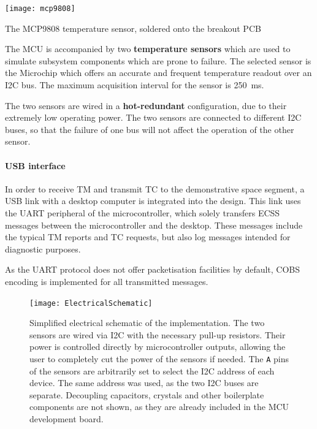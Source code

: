 \documentclass[a4paper,nobib]{tufte-book}
\begin{document}
\begin{marginfigure}
	      \texttt{[image: mcp9808]}
	      \caption{The MCP9808 temperature sensor, soldered onto the breakout \acs{PCB}}
\end{marginfigure}

The \ac{MCU} is accompanied by two \textbf{temperature sensors} which are used to simulate subsystem components which are prone to failure. The selected sensor is the Microchip  which offers an accurate and frequent temperature readout over an \ac{I2C} bus. The maximum acquisition interval for the sensor is \SI{250}{\milli\second}.


The two sensors are wired in a \textbf{hot-redundant} configuration, due to their extremely low operating power. The two sensors are connected to different \ac{I2C} buses, so that the failure of one bus will not affect the operation of the other sensor.

\paragraph{\acs{USB} interface} In order to receive \acl{TM} and transmit \acl{TC} to the demonstrative space segment, a \acs{USB} link with a desktop computer is integrated into the design. This link uses the \acs{UART} peripheral of the microcontroller, which solely transfers \acs{ECSS} messages between the microcontroller and the desktop. These messages include the typical \acs{TM} reports and \acs{TC} requests, but also log messages intended for diagnostic purposes.

As the \acs{UART} protocol does not offer packetisation facilities by default, \ac{COBS} encoding \autocite{cheshire_consistent_overhead_1997} is implemented for all transmitted messages.

\begin{figure}[h]
	\texttt{[image: ElectricalSchematic]}
	\caption[Simplified electrical schematic of the implementation]{Simplified electrical schematic of the implementation. The two sensors are wired via \ac{I2C} with the necessary pull-up resistors. Their power is controlled directly by microcontroller outputs, allowing the user to completely cut the power of the sensors if needed. The \texttt{A} pins of the sensors are arbitrarily set to select the \ac{I2C} address of each device. The same address was used, as the two \ac{I2C} buses are separate. Decoupling capacitors, crystals and other boilerplate components are not shown, as they are already included in the \ac{MCU} development board.}
	\label{fig:schematic}
\end{figure}
\end{document}
